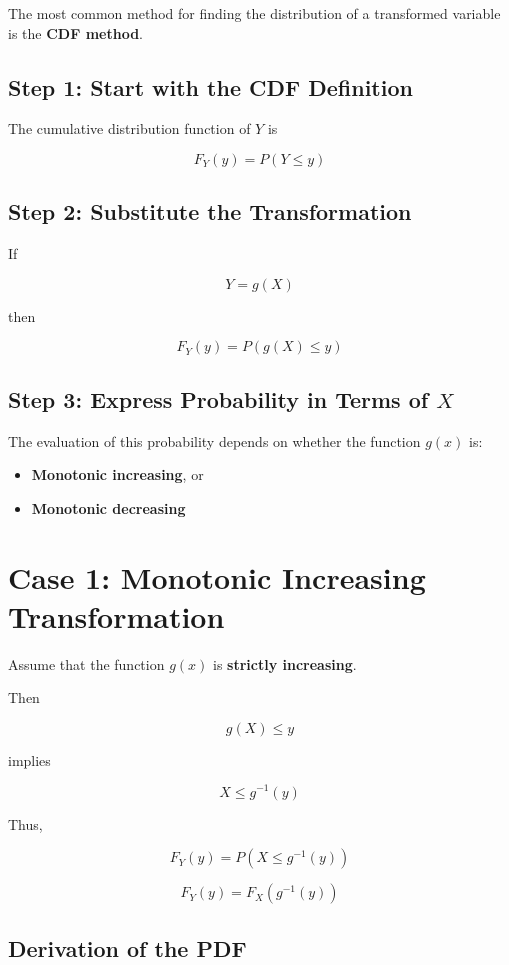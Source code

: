 \documentclass[12pt]{article}
\begin{document}
The most common method for finding the distribution of a transformed variable is the \textbf{CDF method}.

\subsection*{Step 1: Start with the CDF Definition}

The cumulative distribution function of $Y$ is

\[
F_Y(y) = P(Y \leq y)
\]

\subsection*{Step 2: Substitute the Transformation}

If

\[
Y = g(X)
\]

then

\[
F_Y(y) = P(g(X) \leq y)
\]

\subsection*{Step 3: Express Probability in Terms of $X$}

The evaluation of this probability depends on whether the function $g(x)$ is:

\begin{itemize}
\item \textbf{Monotonic increasing}, or
\item \textbf{Monotonic decreasing}
\end{itemize}

\section{Case 1: Monotonic Increasing Transformation}

Assume that the function $g(x)$ is \textbf{strictly increasing}.

Then

\[
g(X) \le y
\]

implies

\[
X \le g^{-1}(y)
\]

Thus,

\[
F_Y(y) = P(X \le g^{-1}(y))
\]

\[
F_Y(y) = F_X(g^{-1}(y))
\]

\subsection*{Derivation of the PDF}
\end{document}
